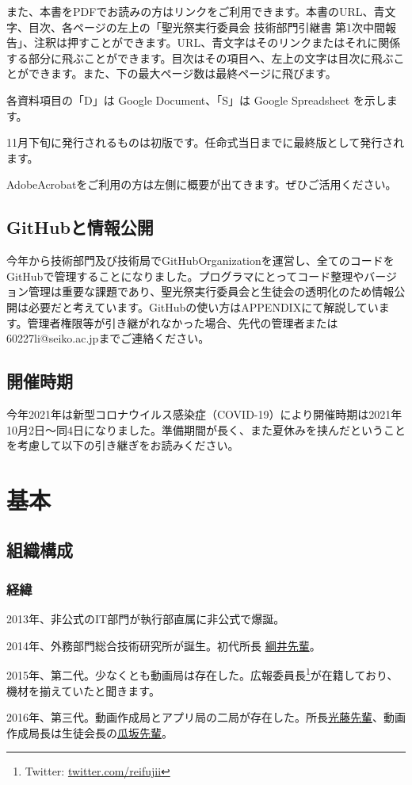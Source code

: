 \documentclass[dvipdfmx,jb5]{jreport}
\newcommand{\mail}[2]{\href{mailto:#2}{#1}}
\newcommand{\Chapter}[1]{\chapter{#1}\thispagestyle{fancy}}
\begin{document}
また、本書をPDFでお読みの方はリンクをご利用できます。本書のURL、青文字、目次、各ページの左上の「聖光祭実行委員会 技術部門引継書 第1次中間報告」、注釈は押すことができます。URL、青文字はそのリンクまたはそれに関係する部分に飛ぶことができます。目次はその項目へ、左上の文字は目次に飛ぶことができます。また、下の最大ページ数は最終ページに飛びます。

各資料項目の「D」は Google Document、「S」は Google Spreadsheet を示します。

11月下旬に発行されるものは初版です。任命式当日までに最終版として発行されます。

AdobeAcrobatをご利用の方は左側に概要が出てきます。ぜひご活用ください。
\section{GitHubと情報公開}
今年から技術部門及び技術局でGitHubOrganizationを運営し、全てのコードをGitHubで管理することになりました。プログラマにとってコード整理やバージョン管理は重要な課題であり、聖光祭実行委員会と生徒会の透明化のため情報公開は必要だと考えています。GitHubの使い方はAPPENDIXにて解説しています。管理者権限等が引き継がれなかった場合、先代の管理者または {\ttfamily 60227li@seiko.ac.jp}までご連絡ください。
\section{開催時期}
今年2021年は新型コロナウイルス感染症（COVID-19）により開催時期は2021年10月2日〜同4日になりました。準備期間が長く、また夏休みを挟んだということを考慮して以下の引き継ぎをお読みください。

\Chapter{基本}
\section{組織構成}
\subsection{経緯}
2013年、非公式のIT部門が執行部直属に非公式で爆誕。

2014年、外務部門総合技術研究所が誕生。初代所長 \mail{綱井先輩}{53127tsunai@seiko.ac.jp}。

2015年、第二代。少なくとも動画局は存在した。広報委員長\footnote{Twitter: \url{twitter.com/reifujii}}が在籍しており、機材を揃えていたと聞きます。

2016年、第三代。動画作成局とアプリ局の二局が存在した。所長\mail{光藤先輩}{55201mitsudo@seiko.ac.jp}、動画作成局長は生徒会長の\mail{瓜坂先輩}{55031urisaka@seiko.ac.jp}。
\end{document}
